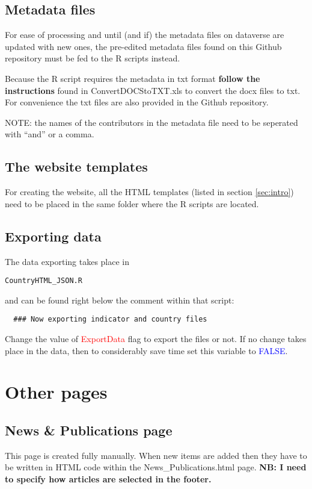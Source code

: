 \documentclass[a4paper]{article}
\begin{document}
\subsection{Metadata files}

For ease of processing and until (and if) the metadata files on dataverse are updated 
with new ones, the pre-edited metadata files found on this Github repository 
must be fed to the R scripts instead.

Because the R script requires the metadata in txt format \textbf{follow the instructions} found in ConvertDOCStoTXT.xls to convert the docx files to txt. For convenience the txt files are also provided in the Github repository.

NOTE: the names of the contributors in the metadata file need to be seperated with ``and'' or a comma.

\subsection{The website templates}

For creating the website, all the HTML templates (listed in section \ref{sec:intro}) need to be placed in the same folder where the R scripts are located.

\subsection{Exporting data}
 The data exporting takes place in 
\begin{verbatim}CountryHTML_JSON.R\end{verbatim} and can 
be found right below the comment within that script: 
 \begin{verbatim}
  ### Now exporting indicator and country files
 \end{verbatim}

Change the value of \textcolor{red}{ExportData} flag to export the files or 
not. If no change takes place in the data, then to considerably save time set 
this variable to \textcolor{blue}{FALSE}.

\section{Other pages}
\subsection{News \& Publications page}
This page is created fully manually. When new items are added then they have to be 
written in HTML code within the News\_Publications.html page. \textbf{NB: I need to specify how articles are selected in the footer.}
\end{document}
